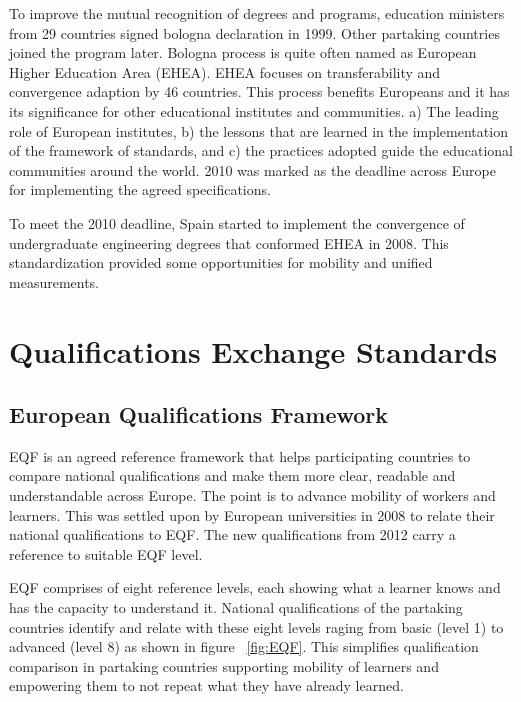 \documentclass[12pt,a4paper,oneside]{book}
\begin{document}
To improve the mutual recognition of degrees and programs, education ministers from 29 countries signed bologna declaration in 1999. Other partaking countries joined the program later. \cite{improvement bologna process} Bologna process is quite often named as European Higher Education Area (EHEA). EHEA focuses on transferability and convergence adaption by 46 countries. This process benefits Europeans and it has its significance for other educational institutes and communities. a) The leading role of European institutes, b) the lessons that are learned in the implementation of the framework of standards, and c) the practices adopted guide the educational communities around the world. 2010 was marked as the deadline across Europe for implementing the agreed specifications. \cite{European Higher Education Area }

To meet the 2010 deadline, Spain started to implement the convergence of undergraduate engineering degrees that conformed EHEA in 2008. This standardization provided some opportunities for mobility and unified measurements. \cite{European Higher Education Area }




\section{Qualifications Exchange Standards}

    \subsection{European Qualifications Framework}
    EQF is an agreed reference framework that helps participating countries to compare national qualifications and make them more clear, readable and understandable across Europe. The point is to advance mobility of workers and learners. This was settled upon by European universities in 2008 to relate their national qualifications to EQF. The new qualifications from 2012 carry a reference to suitable EQF level.

    EQF comprises of eight reference levels, each showing what a learner knows and has the capacity to understand it. National qualifications of the partaking countries identify and relate with these eight levels raging from basic (level 1) to advanced (level 8) as shown in figure ~\ref{fig:EQF}. This simplifies qualification comparison in partaking countries supporting mobility of learners and empowering them to not repeat what they have already learned.
\end{document}
